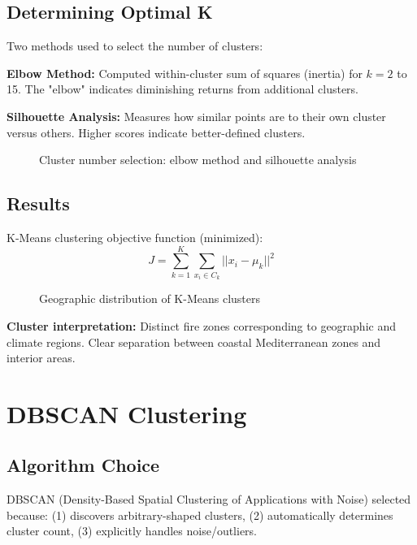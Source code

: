 \subsection*{Determining Optimal K}
Two methods used to select the number of clusters:

\textbf{Elbow Method:} Computed within-cluster sum of squares (inertia) for $k = 2$ to 15. The "elbow" indicates diminishing returns from additional clusters.

\textbf{Silhouette Analysis:} Measures how similar points are to their own cluster versus others. Higher scores indicate better-defined clusters.

\begin{figure}[H]
    \centering
    \caption{Cluster number selection: elbow method and silhouette analysis}
    \label{fig:kmeans_selection}
\end{figure}

\subsection*{Results}
K-Means clustering objective function (minimized):
\begin{equation}
    J = \sum_{k=1}^{K} \sum_{x_i \in C_k} ||x_i - \mu_k||^2
\end{equation}

\begin{figure}[H]
    \centering
    \caption{Geographic distribution of K-Means clusters}
    \label{fig:kmeans_map}
\end{figure}

\textbf{Cluster interpretation:} Distinct fire zones corresponding to geographic and climate regions. Clear separation between coastal Mediterranean zones and interior areas.

\section{DBSCAN Clustering}

\subsection*{Algorithm Choice}
DBSCAN (Density-Based Spatial Clustering of Applications with Noise) selected because: (1) discovers arbitrary-shaped clusters, (2) automatically determines cluster count, (3) explicitly handles noise/outliers.

